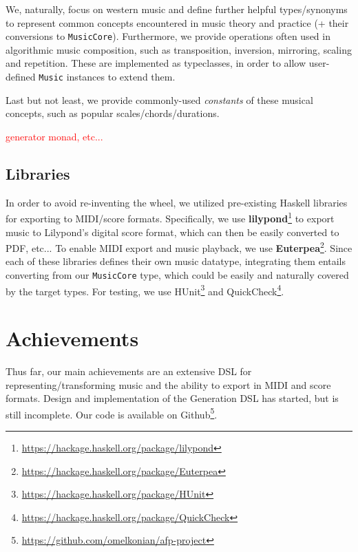\documentclass[11pt,a4paper]{article}
\newcommand{\site}[1]{\footnote{\url{#1}}}
\newcommand{\icode}[1]{\texttt{#1}}
\newcommand\todo[1]{\textcolor{red}{#1}}
\begin{document}
We, naturally, focus on western music and define further helpful types/synonyms to represent common concepts encountered in music theory and practice (+ their conversions to \icode{MusicCore}). Furthermore, we provide operations often used in algorithmic music composition, such as transposition, inversion, mirroring, scaling and repetition. These are implemented as typeclasses, in order to allow user-defined \icode{Music} instances to extend them.

Last but not least, we provide commonly-used \textit{constants} of these musical concepts, such as popular scales/chords/durations.

\todo{generator monad, etc...}

\subsection{Libraries}
In order to avoid re-inventing the wheel, we utilized pre-existing Haskell libraries for exporting to MIDI/score formats. Specifically, we use \textbf{lilypond}\site{https://hackage.haskell.org/package/lilypond} to export music to Lilypond's digital score format, which can then be easily converted to PDF, etc... To enable MIDI export and music playback, we use \textbf{Euterpea}\site{https://hackage.haskell.org/package/Euterpea}. Since each of these libraries defines their own music datatype, integrating them entails converting from our \icode{MusicCore} type, which could be easily and naturally covered by the target types. For testing, we use HUnit\site{https://hackage.haskell.org/package/HUnit} and QuickCheck\site{https://hackage.haskell.org/package/QuickCheck}.

\section{Achievements}
Thus far, our main achievements are an extensive DSL for representing/transforming music and the ability to export in MIDI and score formats.
Design and implementation of the Generation DSL has started, but is still incomplete. Our code is available on Github\site{https://github.com/omelkonian/afp-project}.
\end{document}
